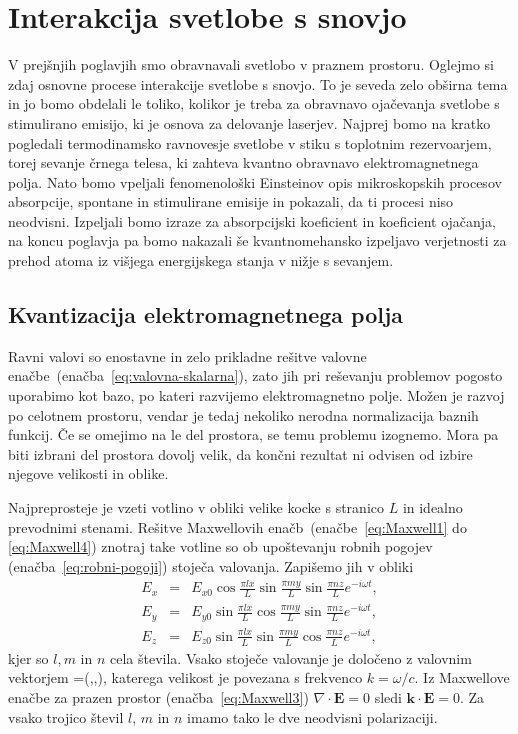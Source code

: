 \chapter{Interakcija svetlobe s snovjo}

V prejšnjih poglavjih smo obravnavali svetlobo v praznem prostoru. Oglejmo si
zdaj osnovne procese interakcije svetlobe s snovjo. To je seveda zelo
obširna tema in jo bomo obdelali le toliko, kolikor je treba za
obravnavo ojačevanja svetlobe s stimulirano emisijo, ki je osnova za
delovanje laserjev. Najprej bomo na kratko pogledali termodinamsko ravnovesje 
svetlobe v stiku s toplotnim rezervoarjem, torej sevanje črnega telesa, ki 
zahteva kvantno obravnavo elektromagnetnega polja. Nato bomo vpeljali fenomenološki
Einsteinov opis mikroskopskih procesov absorpcije, spontane in stimulirane
emisije in pokazali, da ti procesi niso neodvisni. Izpeljali bomo
izraze za absorpcijski koeficient in koeficient ojačanja, na koncu poglavja
pa bomo nakazali še kvantnomehansko izpeljavo verjetnosti za prehod
atoma iz višjega energijskega stanja v nižje s sevanjem.

\section{Kvantizacija elektromagnetnega polja}
Ravni valovi so enostavne in zelo prikladne rešitve valovne 
enačbe~(enačba~\ref{eq:valovna-skalarna}), zato jih pri reševanju problemov pogosto uporabimo kot 
bazo, po kateri razvijemo elektromagnetno polje. Možen je razvoj
po celotnem prostoru, vendar je tedaj nekoliko nerodna normalizacija baznih
funkcij. Če se omejimo na le del prostora, se temu problemu izognemo. Mora pa biti 
izbrani del prostora dovolj velik, da končni rezultat ni odvisen od izbire 
njegove velikosti in oblike.

Najpreprosteje je vzeti votlino v obliki velike kocke s stranico
$L$ in idealno prevodnimi stenami. Rešitve Maxwellovih enačb~(enačbe~\ref{eq:Maxwell1} do \ref{eq:Maxwell4}) 
znotraj take votline so ob upoštevanju robnih pogojev (enačba~\ref{eq:robni-pogoji}) 
stoječa valovanja. Zapišemo jih v obliki
\begin{eqnarray}
E_{x} & = & E_{x0}\cos\frac{\pi lx}{L}\sin\frac{\pi my}{L}\sin\frac{\pi nz}{L}e^{-i\omega t},\nonumber \\
E_{y} & = & E_{y0}\sin\frac{\pi lx}{L}\cos\frac{\pi my}{L}\sin\frac{\pi nz}{L}e^{-i\omega t},\nonumber \\
E_{z} & = & E_{z0}\sin\frac{\pi lx}{L}\sin\frac{\pi my}{L}\cos\frac{\pi nz}{L}e^{-i\omega t},
\label{eq:stojece_votlina}
\end{eqnarray}
kjer so $l,m$ in $n$ cela števila. Vsako stoječe valovanje je določeno z valovnim 
vektorjem
\beq
{}=\left(,,\right),
\eeq 
katerega velikost je povezana s frekvenco $k = \omega/c$.
Iz Maxwellove enačbe za prazen prostor (enačba~\ref{eq:Maxwell3}) 
$\nabla\cdot\mathbf{E}=0$ sledi $\mathbf{k}\cdot\mathbf{E}=0$. 
Za vsako trojico števil $l$, $m$ in $n$ imamo tako le dve
neodvisni polarizaciji.

